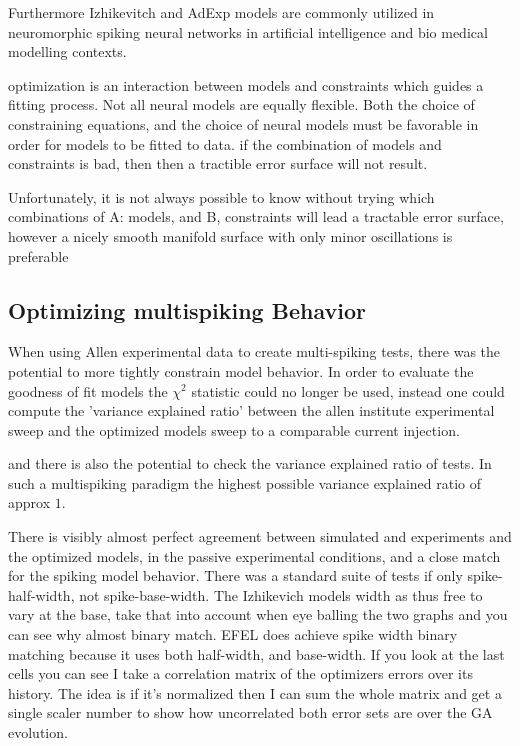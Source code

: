 Furthermore Izhikevitch and AdExp models are commonly utilized in neuromorphic spiking neural networks in artificial intelligence and bio medical modelling contexts.

optimization is an interaction between models and constraints which guides a fitting process. Not all neural models are equally flexible.  
Both the choice of constraining equations, and the choice of neural models must be favorable in order for models to be fitted to data.
if the combination of models and constraints is bad, then then a tractible error surface will not result.  

Unfortunately, it is not always possible to know without trying which combinations of A: models, and B, constraints will lead a tractable error surface, however a nicely smooth manifold surface with only minor oscillations is preferable


\subsection{Optimizing multispiking Behavior}

When using Allen experimental data to create multi-spiking tests, there was the potential to more tightly constrain model behavior. In order to evaluate the goodness of fit models the $\chi^{2}$ statistic could no longer be used, instead one could compute the 'variance explained ratio' between the allen institute experimental sweep and the optimized models sweep to a comparable current injection.

and there is also the potential to check the variance explained ratio of tests. In such a multispiking paradigm the highest possible variance explained ratio of approx $1$. 


There is visibly almost perfect  agreement between simulated and experiments and the optimized models, in the passive experimental conditions, and a close match for the spiking model behavior. There was a standard suite of tests if only spike-half-width, not spike-base-width. The Izhikevich models width as thus free to vary at the base, take that into account when eye balling the two graphs and you can see why almost binary match. EFEL does achieve spike width binary matching because it uses both half-width, and base-width. If you look at the last cells you can see I take a correlation matrix of the optimizers errors over its history. The idea is if it's normalized then I can sum the whole matrix and get a single scaler number to show how uncorrelated both error sets are over the GA evolution. 

